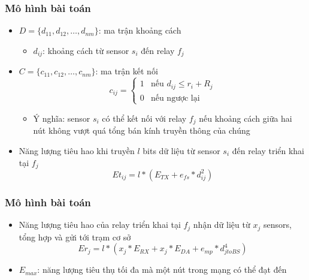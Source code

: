 \begin{frame}
    \frametitle{Mô hình bài toán}
    \begin{itemize}
        \item $D = \{d_{11}, d_{12},…, d_{nm}\}$: ma trận khoảng cách 
        \begin{itemize}
            \item[] $d_{ij}$: khoảng cách từ sensor $s_i$ đến relay $f_j$
        \end{itemize}
        \item $C = \{c_{11}, c_{12},…, c_{nm}\}$: ma trận kết nối
        \begin{equation} 
            c_{ij} = \begin{cases}
                1 & \textrm{nếu $d_{ij} \leq r_i + R_j$}\\
                0 & \textrm{nếu ngược lại}
            \end{cases}
            \label{eqn:simple_one} 
        \end{equation}     
        \begin{itemize}
            \item[] Ý nghĩa: sensor $s_i$ có thể kết nối với relay $f_j$ nếu khoảng cách giữa hai nút không vượt quá tổng bán kính truyền thông của chúng
        \end{itemize}
        \item Năng lượng tiêu hao khi truyền $l$ bits dữ liệu từ sensor $s_i$ đến relay triển khai tại $f_j$ \footnotemark
        \begin{equation}
            Et_{ij} = l * (E_{TX} + e_{fs} * d_{ij}^2) 
            \label{sensor_consumption}
        \end{equation} 
    \end{itemize}
    
\end{frame}

\begin{frame}
    \frametitle{Mô hình bài toán}
    \begin{itemize}
        \item Năng lượng tiêu hao của relay triển khai tại $f_j$ nhận dữ liệu từ $x_j$ sensors, tổng hợp và gửi tới trạm cơ sở \footnotemark
    \begin{equation}
        Er_j = l * (x_j * E_{RX} + x_j * E_{DA} + e_{mp} * d_{jtoBS}^4)
        \label{relay_consumption}
    \end{equation}
    \item $E_{max}$: năng lượng tiêu thụ tối đa mà một nút trong mạng có thể đạt đến
    \end{itemize}

\end{frame}

